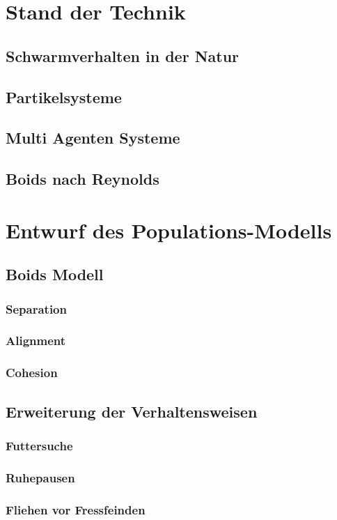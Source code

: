 \documentclass[draft=false
              ,paper=a4
              ,twoside=false
              ,fontsize=11pt
              ,headsepline
              ,BCOR10mm
              ,DIV11
              ,bibtotoc
              ,liststotoc
              ]{scrbook}
\begin{document}
\chapter{Stand der Technik}
\section{Schwarmverhalten in der Natur}
\section{Partikelsysteme}
\section{Multi Agenten Systeme}
\section{Boids nach Reynolds}

\chapter{Entwurf des Populations-Modells}
\section{Boids Modell}
\subsection{Separation}
\subsection{Alignment}
\subsection{Cohesion}

\section{Erweiterung der Verhaltensweisen}
\subsection{Futtersuche}
\subsection{Ruhepausen}
\subsection{Fliehen vor Fressfeinden}
\end{document}
